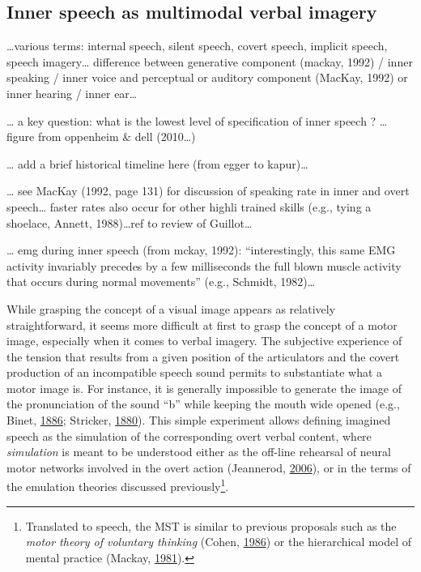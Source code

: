 \documentclass[a4paper,12pt,twoside,openright,oldfontcommands]{memoir}
\let\rmarkdownfootnote\footnote%
\def\footnote{\protect\rmarkdownfootnote}
\begin{document}
\subsection{Inner speech as multimodal verbal
imagery}\label{inner-speech-as-multimodal-verbal-imagery}

\ldots{}various terms: internal speech, silent speech, covert speech,
implicit speech, speech imagery\ldots{} difference between generative
component (mackay, 1992) / inner speaking / inner voice and perceptual
or auditory component (MacKay, 1992) or inner hearing / inner
ear\ldots{}

\ldots{} a key question: what is the lowest level of specification of
inner speech ? \ldots{} figure from oppenheim \& dell (2010\ldots{})

\ldots{} add a brief historical timeline here (from egger to
kapur)\ldots{}

\ldots{} see MacKay (1992, page 131) for discussion of speaking rate in
inner and overt speech\ldots{} faster rates also occur for other highli
trained skills (e.g., tying a shoelace, Annett, 1988)\ldots{}ref to
review of Guillot\ldots{}

\ldots{} emg during inner speech (from mckay, 1992): ``interestingly,
this same EMG activity invariably precedes by a few milliseconds the
full blown muscle activity that occurs during normal movements'' (e.g.,
Schmidt, 1982)\ldots{}

While grasping the concept of a visual image appears as relatively
straightforward, it seems more difficult at first to grasp the concept
of a motor image, especially when it comes to verbal imagery. The
subjective experience of the tension that results from a given position
of the articulators and the covert production of an incompatible speech
sound permits to substantiate what a motor image is. For instance, it is
generally impossible to generate the image of the pronunciation of the
sound ``b'' while keeping the mouth wide opened (e.g., Binet,
\protect\hyperlink{ref-binet_psychologie_1886}{1886}; Stricker,
\protect\hyperlink{ref-stricker_studien_1880}{1880}). This simple
experiment allows defining imagined speech as the simulation of the
corresponding overt verbal content, where \emph{simulation} is meant to
be understood either as the off-line rehearsal of neural motor networks
involved in the overt action (Jeannerod,
\protect\hyperlink{ref-jeannerod_motor_2006}{2006}), or in the terms of
the emulation theories discussed previously\footnote{Translated to
  speech, the MST is similar to previous proposals such as the
  \emph{motor theory of voluntary thinking} (Cohen,
  \protect\hyperlink{ref-cohen_motor_1986}{1986}) or the hierarchical
  model of mental practice (Mackay,
  \protect\hyperlink{ref-mackay_problem_1981}{1981}).}.
\end{document}
